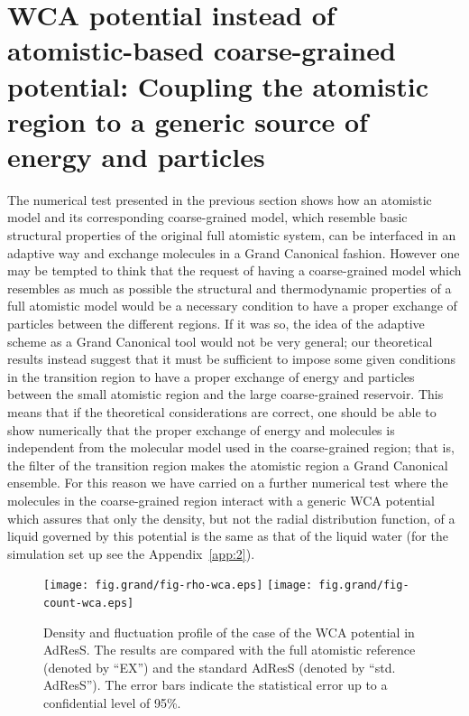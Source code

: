 \documentclass[aip,jcp,a4paper,reprint,onecolumn]{revtex4-1}
\newcommand{\redc}[1]{{\color{red} #1}}
\begin{document}
\section{WCA potential instead of atomistic-based coarse-grained potential: Coupling the atomistic region to a generic source of energy and particles}
The numerical test presented in the previous section shows how an atomistic model and its corresponding coarse-grained model, which resemble basic structural properties of the original full atomistic system, can be interfaced in an adaptive way and exchange molecules in a Grand Canonical fashion. However one may be \redc{tempted} to think that the request of having a coarse-grained model which resembles as much as possible the structural and thermodynamic properties of a full atomistic model would be a necessary condition to have a proper exchange of particles between the different regions. If it was so, the idea of the adaptive scheme as a Grand Canonical tool would not be very general; our theoretical results instead suggest that it must be sufficient to impose some given conditions in the transition region to have a proper exchange of energy and particles between the small atomistic region and the large coarse-grained reservoir. 
This means that if the theoretical considerations are correct, one should be able to show numerically that the proper exchange of energy and molecules is independent from the molecular model used in the coarse-grained region; that is, the filter of the transition region makes the atomistic region a Grand Canonical ensemble. For this reason we have carried on a further numerical test where the molecules in the coarse-grained region interact with a generic WCA potential which assures that only the density, but not the radial distribution function, of a liquid governed by this potential is the same as that of the liquid water (for the simulation set up see the Appendix~\ref{app:2}).
\begin{figure}
  \centering
  \texttt{[image: fig.grand/fig-rho-wca.eps]}
  \texttt{[image: fig.grand/fig-count-wca.eps]}
  \caption{Density and fluctuation profile of the case of the WCA potential in AdResS.  The
    results are compared with the full atomistic reference (denoted by
    ``EX'') and the  standard AdResS (denoted by ``std. AdResS'').
    The error bars indicate the statistical error up to a confidential
    level of 95\%.
  }
  \label{fig:wca-den}
\end{figure}
\end{document}
